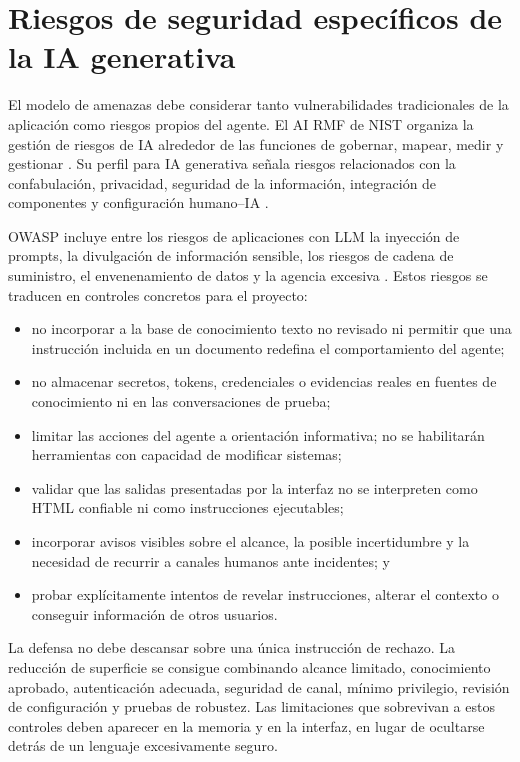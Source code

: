 \documentclass[12pt,twoside,titlepage]{book}
\begin{document}
\section{Riesgos de seguridad específicos de la IA generativa}
\label{sec:riesgos-ia-generativa}

El modelo de amenazas debe considerar tanto vulnerabilidades tradicionales de la
aplicación como riesgos propios del agente. El AI RMF de NIST organiza la gestión
de riesgos de IA alrededor de las funciones de gobernar, mapear, medir y
gestionar \cite{nistAiRmf2023}. Su perfil para IA generativa señala riesgos
relacionados con la confabulación, privacidad, seguridad de la información,
integración de componentes y configuración humano--IA \cite{nistGenAi2024}.

OWASP incluye entre los riesgos de aplicaciones con LLM la inyección de prompts,
la divulgación de información sensible, los riesgos de cadena de suministro, el
envenenamiento de datos y la agencia excesiva \cite{owaspLlm2026}. Estos riesgos
se traducen en controles concretos para el proyecto:

\begin{itemize}
  \item no incorporar a la base de conocimiento texto no revisado ni permitir que
  una instrucción incluida en un documento redefina el comportamiento del agente;
  \item no almacenar secretos, tokens, credenciales o evidencias reales en
  fuentes de conocimiento ni en las conversaciones de prueba;
  \item limitar las acciones del agente a orientación informativa; no se
  habilitarán herramientas con capacidad de modificar sistemas;
  \item validar que las salidas presentadas por la interfaz no se interpreten como
  HTML confiable ni como instrucciones ejecutables;
  \item incorporar avisos visibles sobre el alcance, la posible incertidumbre y
  la necesidad de recurrir a canales humanos ante incidentes; y
  \item probar explícitamente intentos de revelar instrucciones, alterar el
  contexto o conseguir información de otros usuarios.
\end{itemize}

La defensa no debe descansar sobre una única instrucción de rechazo. La reducción
de superficie se consigue combinando alcance limitado, conocimiento aprobado,
autenticación adecuada, seguridad de canal, mínimo privilegio, revisión de
configuración y pruebas de robustez. Las limitaciones que sobrevivan a estos
controles deben aparecer en la memoria y en la interfaz, en lugar de ocultarse
detrás de un lenguaje excesivamente seguro.
\end{document}
